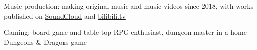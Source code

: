 \documentclass[letter,10pt]{article}
\begin{document}
\begin{zitemize}
\item Music production: making original music and music videos since 2018, with works published on \href{https://soundcloud.com/yifever}{SoundCloud} and \href{https://space.bilibili.com/334342354}{bilibili.tv}
\item Gaming: board game and table-top RPG enthusiast, dungeon master in a home Dungeons \& Dragons game
\end{zitemize}
\end{document}
